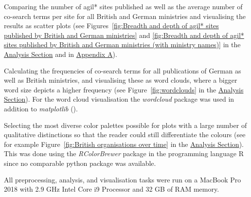 \begin{compactitem}
\item Comparing the number of agil* sites published as well as the average number of co-search terms per site for all British and German ministries and visualising the results as scatter plots (see Figures~\ref{fig:Breadth and depth of agil* sites published by British and German ministries} and \ref{fig:Breadth and depth of agil* sites published by British and German ministries (with ministry names)} in the \hyperref[Analysis]{Analysis Section} and in \hyperref[Appendix A]{Appendix A}). 
\item Calculating the frequencies of co-search terms for all publications of German as well as British ministries, and visualising these as word clouds, where a bigger word size depicts a higher frequency (see Figure~\ref{fig:wordclouds} in the \hyperref[Analysis]{Analysis Section}). For the word cloud visualisation the \textit{wordcloud} \parencite{Mueller2020} package was used in addition to \textit{matplotlib} (\cite{Hunter2007}).  
\item Selecting the most diverse color palettes possible for plots with a large number of qualitative distinctions so that the reader could still differentiate the colours (see for example Figure~\ref{fig:British organisations over time} in the \hyperref[Analysis]{Analysis Section}). This was done using the \textit{RColorBrewer} package \parencite{Neuwirth2020} in the programming language R since no comparable python package was available. 
\end{compactitem}
\noindent
All preprocessing, analysis, and visualisation tasks were run on a MacBook Pro 2018 with 2.9 GHz Intel Core i9 Processor and 32 GB of RAM memory. 

